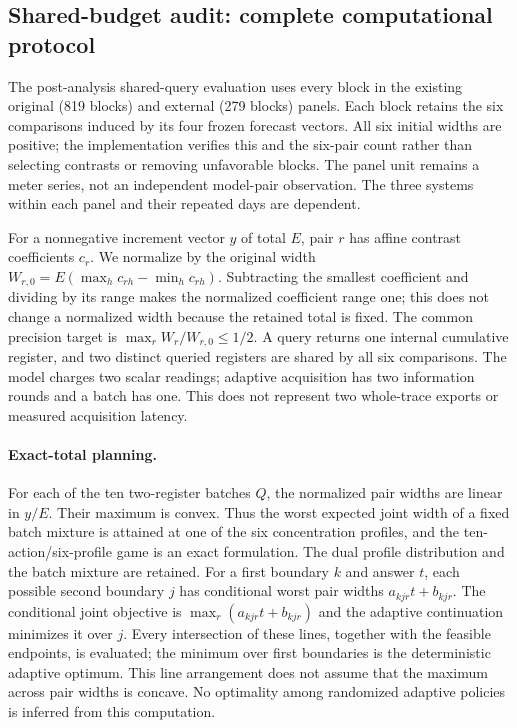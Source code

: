 \subsection{Shared-budget audit: complete computational protocol}
\label{sec:joint_shared_protocol}
The post-analysis shared-query evaluation uses every block in the existing
original (819 blocks) and external (279 blocks) panels. Each block retains the
six comparisons induced by its four frozen forecast vectors. All six initial
widths are positive; the implementation verifies this and the six-pair count
rather than selecting contrasts or removing unfavorable blocks. The panel
unit remains a meter series, not an independent model-pair observation. The
three systems within each panel and their repeated days are dependent.

For a nonnegative increment vector $y$ of total $E$, pair $r$ has affine
contrast coefficients $c_r$. We normalize by the original width
$W_{r,0}=E(\max_hc_{rh}-\min_hc_{rh})$. Subtracting the smallest coefficient
and dividing by its range makes the normalized coefficient range one; this
does not change a normalized width because the retained total is fixed.
The common precision target is $\max_r W_r/W_{r,0}\leq1/2$. A query returns
one internal cumulative register, and two distinct queried registers are
shared by all six comparisons. The model charges two scalar readings;
adaptive acquisition has two information rounds and a batch has one. This
does not represent two whole-trace exports or measured acquisition latency.

\paragraph{Exact-total planning.}
For each of the ten two-register batches $Q$, the normalized pair widths
are linear in $y/E$. Their maximum is convex. Thus the worst expected joint
width of a fixed batch mixture is attained at one of the six concentration
profiles, and the ten-action/six-profile game is an exact formulation.
The dual profile distribution and the batch mixture are retained. For a
first boundary $k$ and answer $t$, each possible second boundary $j$ has
conditional worst pair widths $a_{kjr}t+b_{kjr}$.
The conditional joint objective is $\max_r(a_{kjr}t+b_{kjr})$ and the
adaptive continuation minimizes it over $j$. Every intersection of these
lines, together with the feasible endpoints, is evaluated; the minimum over
first boundaries is the deterministic adaptive optimum. This line arrangement
does not assume that the maximum across pair widths is concave. No optimality
among randomized adaptive policies is inferred from this computation.

